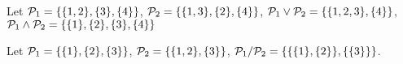 \begin{example}
Let $\P_1 = \{\{1, 2\}, \{3\}, \{4\}\}$, $\P_2 = \{\{1,3\},\{2\},\{4\}\}$, $\P_1\vee \P_2 = \{\{1,2,3\},\{4\}\}$, $\P_1 \wedge \P_2 = \{\{1\},\{2\},\{3\}, \{4\}\}$
\end{example}
\begin{example}
Let $\P_1 = \{\{1\}, \{2\}, \{3\}\}$, $\P_2 = \{\{1,2\},\{3\}\}$, $\P_1 / \P_2 = \{\{\{1\},\{2\}\},\{\{3\}\}\}$.
\end{example}
